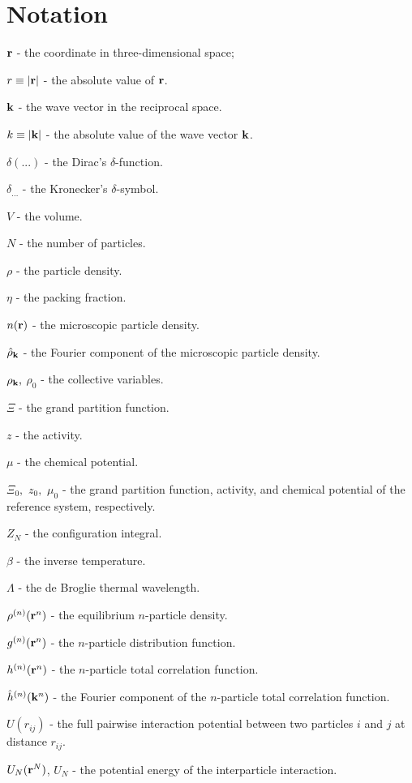 \section{Notation}
$\vb r$ - the coordinate in three-dimensional space;

$r \equiv \abs{\vb r}$ - the absolute value of $\vb r$.

$\vb k$ - the wave vector in the reciprocal space.

$k \equiv \abs{\vb k}$ - the absolute value of the wave vector $\vb k$.

$\delta(...)$ - the Dirac's $\delta$-function.

$\delta_{...}$ - the Kronecker's $\delta$-symbol.

$V$ - the volume.

$N$ - the number of particles.

$\rho$ - the particle density.

$\eta$ - the packing fraction.

$n(\vb r)$ - the microscopic particle density.

$\hat{\rho}_{\vb k}$ - the Fourier component of the microscopic particle density.

$\rho_{\vb k},$ $\rho_0$ - the collective variables.

$\Xi$ - the grand partition function.

$z$ - the activity.

$\mu$ - the chemical potential.

$\Xi_0,$ $z_0,$ $\mu_0$ - the grand partition function, activity, and chemical potential of the reference system, respectively.

$Z_N$ - the configuration integral.

$\beta$ - the inverse temperature.

$\Lambda$ - the de Broglie thermal wavelength.

$\rho^{(n)}(\vb r^n)$ - the equilibrium $n$-particle density.

$g^{(n)}(\vb r^n)$ - the $n$-particle distribution function.

$h^{(n)}(\vb r^n)$ - the $n$-particle total correlation function.

$\hat{h}^{(n)}(\vb k^n)$ - the Fourier component of the $n$-particle total correlation function.

$U(r_{ij})$ - the full pairwise interaction potential between two particles $i$ and $j$ at distance $r_{ij}$.

$U_N(\vb r^N)$, $U_N$ - the potential energy of the interparticle interaction.

